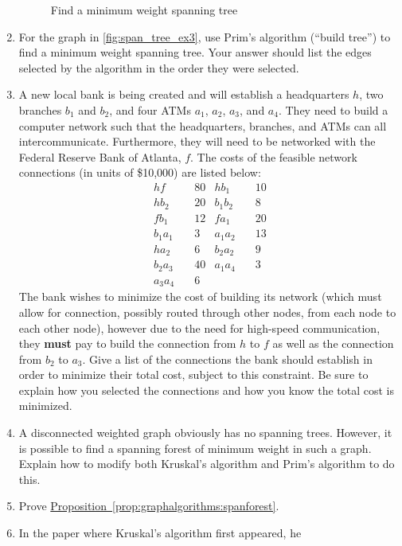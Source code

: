 \begin{enumerate}
\begin{figure}[h]
    \caption{Find a minimum weight spanning tree}
    \label{fig:span_tree_ex3}
  \end{figure}
\item For the graph in \autoref{fig:span_tree_ex3}, use Prim's
  algorithm (``build tree'') to find a minimum weight spanning
  tree. Your answer should list the edges selected by the algorithm in
  the order they were selected.
\item A new local bank is being created and will establish a
  headquarters $h$, two branches $b_1$ and $b_2$, and four ATMs $a_1$,
  $a_2$, $a_3$, and $a_4$. They need to build a computer network such
  that the headquarters, branches, and ATMs can all
  intercommunicate. Furthermore, they will need to be networked with
  the Federal Reserve Bank of Atlanta, $f$. The costs of the feasible
  network connections (in units of \$10,000) are listed below:
  \begin{align*}
    h f & \quad 80 &
    h b_1 & \quad 10\\
    h b_2 & \quad 20&
    b_1 b_2 & \quad 8\\
    f b_1 & \quad 12&
    f a_1 & \quad 20\\
    b_1 a_1 & \quad 3&
    a_1 a_2 & \quad 13\\
    h a_2 & \quad 6&
    b_2 a_2 & \quad 9\\
    b_2 a_3 & \quad 40&
    a_1 a_4 & \quad 3\\
    a_3 a_4 &\quad 6
  \end{align*}
  The bank wishes to minimize the cost of building its network (which
  must allow for connection, possibly routed through other nodes, from
  each node to each other node), however due to the need for
  high-speed communication, they \textbf{must} pay to build the
  connection from $h$ to $f$ as well as the connection from $b_2$ to
  $a_3$. Give a list of the connections the bank should establish in
  order to minimize their total cost, subject to this constraint. Be
  sure to explain how you selected the connections and how you know
  the total cost is minimized.
\item A disconnected weighted graph obviously has no spanning
  trees. However, it is possible to find a spanning forest of minimum
  weight in such a graph. Explain how to modify both Kruskal's
  algorithm and Prim's algorithm to do this.
\item Prove
  \hyperref[prop:graphalgorithms:spanforest]{Proposition~\ref*{prop:graphalgorithms:spanforest}}.
\item In the paper where Kruskal's algorithm first appeared, he

\end{enumerate}
